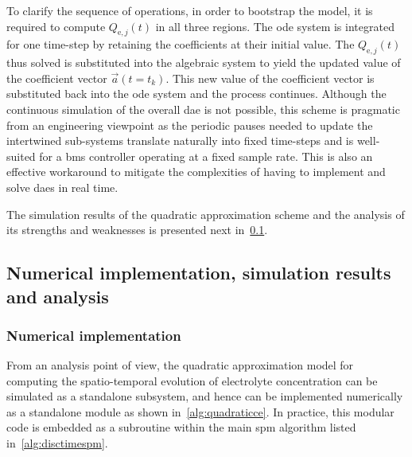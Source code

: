 To clarify the  sequence of operations, in  order to bootstrap the  model, it is
required  to compute  $Q_{\text{e},j}(t)$ in  all three  regions. The  \gls{ode}
system  is  integrated  for  one  time-step by  retaining  the  coefficients  at
their initial  value. The  $Q_{\text{e},j}(t)$ thus  solved is  substituted into
the  algebraic system  to  yield the  updated value  of  the coefficient  vector
$\vec{a}(t=t_k)$. This new  value of the coefficient vector  is substituted back
into the  \gls{ode} system  and the process  continues. Although  the continuous
simulation of  the overall \gls{dae} is  not possible, this scheme  is pragmatic
from  an engineering  viewpoint  as the  periodic pauses  needed  to update  the
intertwined  sub-systems  translate  naturally  into  fixed  time-steps  and  is
well-suited for a \gls{bms} controller operating at a fixed sample rate. This is
also an effective workaround to mitigate the complexities of having to implement
and solve \glspl{dae} in real time.

The   simulation   results   of   the   quadratic   approximation   scheme   and
the   analysis   of   its   strengths   and   weaknesses   is   presented   next
in~\cref{subsec:quadraticsimresultsanalysis}.

\subsection{Numerical implementation, simulation results and analysis}\label{subsec:quadraticsimresultsanalysis}

\subsubsection*{Numerical implementation}
From an analysis point of view,  the quadratic approximation model for computing
the spatio-temporal evolution of electrolyte concentration can be simulated as a
standalone subsystem, and  hence can be implemented numerically  as a standalone
module  as  shown  in~\cref{alg:quadraticce}.  In practice,  this  modular  code
is  embedded  as  a  subroutine  within  the  main  \gls{spm}  algorithm  listed
in~\cref{alg:disctimespm}.



